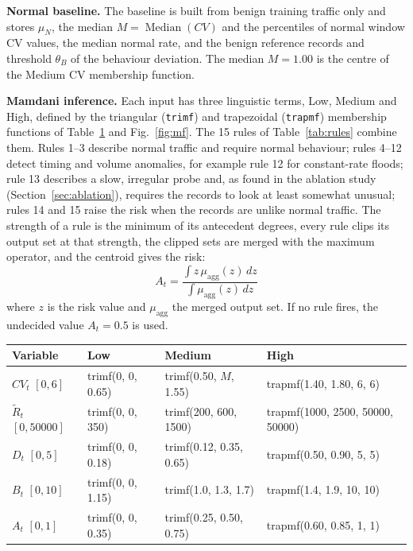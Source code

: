 \documentclass[]{interact}
\theoremstyle{plain}
\theoremstyle{definition}
\begin{document}
\textbf{Normal baseline.} The baseline is built from benign training traffic only and stores $\mu_N$, the median $M = \operatorname{Median}(CV)$ and the percentiles of normal window CV values, the median normal rate, and the benign reference records and threshold $\theta_B$ of the behaviour deviation. The median $M = 1.00$ is the centre of the Medium CV membership function.

\textbf{Mamdani inference.} Each input has three linguistic terms, Low, Medium and High, defined by the triangular (\texttt{trimf}) and trapezoidal (\texttt{trapmf}) membership functions of Table~\ref{tab:mf} and Fig.~\ref{fig:mf}. The 15 rules of Table~\ref{tab:rules} combine them. Rules 1--3 describe normal traffic and require normal behaviour; rules 4--12 detect timing and volume anomalies, for example rule 12 for constant-rate floods; rule 13 describes a slow, irregular probe and, as found in the ablation study (Section~\ref{sec:ablation}), requires the records to look at least somewhat unusual; rules 14 and 15 raise the risk when the records are unlike normal traffic. The strength of a rule is the minimum of its antecedent degrees, every rule clips its output set at that strength, the clipped sets are merged with the maximum operator, and the centroid gives the risk:
\begin{equation}
  A_t = \frac{\int z\,\mu_{\mathrm{agg}}(z)\,dz}{\int \mu_{\mathrm{agg}}(z)\,dz}
\end{equation}
where $z$ is the risk value and $\mu_{\mathrm{agg}}$ the merged output set. If no rule fires, the undecided value $A_t = 0.5$ is used.

\begin{table}[htbp]
{\small
\begin{tabular}{llll}
\toprule
Variable & Low & Medium & High \\
\midrule
$CV_t$ $[0,6]$             & trimf(0, 0, 0.65)   & trimf(0.50, $M$, 1.55)   & trapmf(1.40, 1.80, 6, 6) \\
$\tilde{R}_t$ $[0,50000]$  & trimf(0, 0, 350)    & trimf(200, 600, 1500)    & trapmf(1000, 2500, 50000, 50000) \\
$D_t$ $[0,5]$              & trimf(0, 0, 0.18)   & trimf(0.12, 0.35, 0.65)  & trapmf(0.50, 0.90, 5, 5) \\
$B_t$ $[0,10]$             & trimf(0, 0, 1.15)   & trimf(1.0, 1.3, 1.7)     & trapmf(1.4, 1.9, 10, 10) \\
$A_t$ $[0,1]$              & trimf(0, 0, 0.35)   & trimf(0.25, 0.50, 0.75)  & trapmf(0.60, 0.85, 1, 1) \\
\bottomrule
\end{tabular}}
\label{tab:mf}
\end{table}
\end{document}
